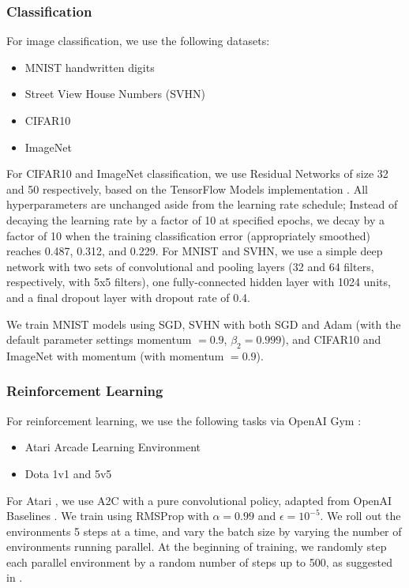 \documentclass[english]{article}
\begin{document}
\subsubsection{Classification}

For image classification, we use the following datasets:
\begin{itemize}
\item MNIST handwritten digits \cite{lecun-mnisthandwrittendigit-2010}
\item Street View House Numbers (SVHN) \cite{Netzer2011ReadingDI}
\item CIFAR10 \cite{Krizhevsky2009LearningML}
\item ImageNet \cite{imagenet_cvpr09}
\end{itemize}
For CIFAR10 and ImageNet classification, we use Residual Networks \cite{DBLP:journals/corr/HeZRS15} of size 32 and 50 respectively, based on the TensorFlow Models implementation \cite{TF_Official_Resnet}.  All hyperparameters are unchanged aside from the learning rate schedule;  Instead of decaying the learning rate by a factor of 10 at specified epochs, we decay by a factor of 10 when the training classification error (appropriately smoothed) reaches 0.487, 0.312, and 0.229. For MNIST and SVHN, we use a simple deep network with two sets of convolutional and pooling layers (32 and 64 filters, respectively, with 5x5 filters), one fully-connected hidden layer with 1024 units, and a final dropout layer with dropout rate of 0.4.

We train MNIST models using SGD, SVHN with both SGD and Adam \cite{kingma2014adam}  (with the default parameter settings momentum $=0.9$, $\beta_2 = 0.999$), and CIFAR10 and ImageNet with momentum \cite{pmlr-v28-sutskever13} (with momentum $= 0.9$).

\subsubsection{Reinforcement Learning}

For reinforcement learning, we use the following tasks via OpenAI Gym \cite{1606.01540}:
\begin{itemize}
\item Atari Arcade Learning Environment \cite{DBLP:journals/corr/abs-1207-4708}
\item Dota 1v1 and 5v5 \cite{OpenAI_Five}
\end{itemize}
For Atari%
, we use A2C \cite{DBLP:journals/corr/MnihBMGLHSK16} with a pure convolutional 
policy, adapted from OpenAI Baselines \cite{baselines}.  We train using RMSProp with $\alpha = 0.99$ and $\epsilon = 10^{-5}$. We roll out the environments 5 steps at a time, and vary the batch size by varying the number of environments running parallel. At the beginning of training, we randomly step each parallel environment by a random number of steps up to 500, as suggested in \cite{1803.02811}.
\end{document}
